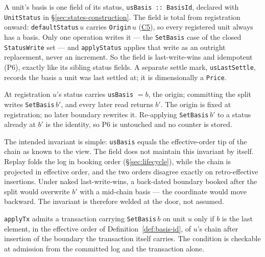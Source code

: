\begin{definition}
\label{def:usbasis}
A unit's basis is one field of its status, \texttt{usBasis :: BasisId}, declared with
\texttt{UnitStatus} in \S\ref{sec:states-construction}. The field is total from
registration onward: \texttt{defaultStatus}\,$u$ carries \texttt{Origin}\,$u$
(\hyperref[cond:C5]{C5}), so every registered unit always has a basis. Only one
operation writes it --- the \texttt{SetBasis} case of the closed \texttt{StatusWrite}
set --- and \texttt{applyStatus} applies that write as an outright replacement, never an
increment. So the field is last-write-wins and idempotent (P6), exactly like its sibling
status fields. A separate settle mark, \texttt{usLastSettle}, records the basis a unit
was last settled at; it is dimensionally a \texttt{Price}.
\end{definition}

At registration $u$'s status carries \texttt{usBasis} $= b$, the origin; committing
the split writes \texttt{SetBasis}\,$b'$, and every later read returns $b'$. The
origin is fixed at registration; no later boundary rewrites it. Re-applying
\texttt{SetBasis}\,$b'$ to a status already at $b'$ is the identity, so P6 is
untouched and no counter is stored.

The intended invariant is simple: \texttt{usBasis} equals the effective-order tip
of the chain as known to the view. The field does not maintain this invariant by
itself. Replay folds the log in booking order (\S\ref{sec:lifecycle}), while the
chain is projected in effective order, and the two orders disagree exactly on
retro-effective insertions. Under naked last-write-wins, a back-dated boundary
booked after the split would overwrite $b'$ with a mid-chain basis --- the
coordinate would move backward. The invariant is therefore welded at the door,
not assumed.

\begin{principle}
\label{prin:tip-weld}
\texttt{applyTx} admits a transaction carrying \texttt{SetBasis}\,$b$ on unit $u$ only if
$b$ is the last element, in the effective order of
Definition~\ref{def:basis-id}, of $u$'s chain after insertion of the boundary the
transaction itself carries. The condition is checkable at admission from the committed
log and the transaction alone.
\end{principle}

